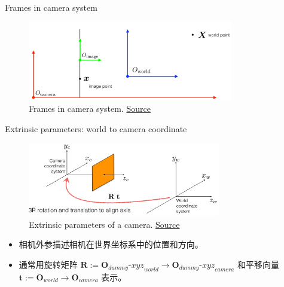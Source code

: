 \documentclass[10pt,xcolor={table,dvipsnames},t]{beamer}
\begin{document}
\begin{frame}{Frames in camera system}
  \begin{figure}
    \centering
    \includegraphics[width=0.8\textwidth]{figures/camera-frames.png}
    \caption{Frames in camera system. \href{https://www.cs.cmu.edu/~16385/s17/Slides/11.1\_Camera\_matrix.pdf}{Source}}
  \end{figure}
\end{frame}

\begin{frame}{Extrinsic parameters: world to camera coordinate}
      \begin{figure}
        \centering
        \includegraphics[width=0.75\textwidth]{figures/extrinsic-parameters.png}
        \caption{Extrinsic parameters of a camera. \href{https://www.cs.cmu.edu/~16385/s17/Slides/11.1\_Camera\_matrix.pdf}{Source}}
      \end{figure}
  
      \begin{itemize}
        \item 相机外参描述相机在世界坐标系中的位置和方向。
        \item 通常用旋转矩阵 $\mathbf{R} := \mathbf{O}_{dummy}\text{-}{xyz}_{world} \to \mathbf{O}_{dummy}\text{-}{xyz}_{camera}$ 和平移向量 $\mathbf{t} := \mathbf{O}_{world} \to \mathbf{O}_{camera}$ 表示。
      \end{itemize}
\end{frame}
\end{document}
